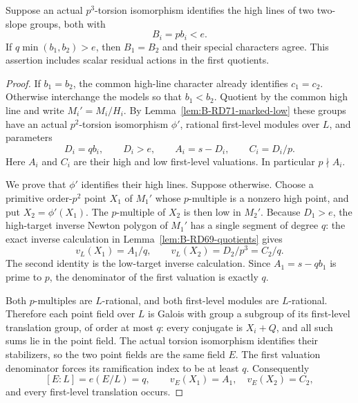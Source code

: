 \begin{proposition}
\label{prop:B-RD71-separated-high}
Suppose an actual \(p^3\)-torsion isomorphism identifies the
high lines of two two-slope groups, both with
\[
 B_i=pb_i<e.
 \tag{B-RD71.4}
\]
If \(q\min(b_1,b_2)>e\), then \(B_1=B_2\) and their special
characters agree. This assertion includes scalar residual
actions in the first quotients.
\end{proposition}
\begin{proof}
If \(b_1=b_2\), the common high-line character already
identifies \(c_1=c_2\). Otherwise interchange the models
so that \(b_1<b_2\).
Quotient by the common high line and write \(M_i'=M_i/H_i\).
By Lemma~\ref{lem:B-RD71-marked-low} these groups have an
actual \(p^2\)-torsion isomorphism \(\phi'\), rational
first-level modules over \(L\), and parameters
\[
 D_i=q b_i,\qquad D_i>e,\qquad
 A_i=s-D_i,\qquad C_i=D_i/p .
 \tag{B-RD71.5}
\]
Here \(A_i\) and \(C_i\) are their high and low first-level
valuations. In particular \(p\nmid A_i\).

We prove that \(\phi'\) identifies their high lines.
Suppose otherwise. Choose a primitive order-\(p^2\) point
\(X_1\) of \(M_1'\) whose \(p\)-multiple is a nonzero high
point, and put \(X_2=\phi'(X_1)\).
The \(p\)-multiple of \(X_2\) is then low in \(M_2'\).
Because \(D_1>e\), the high-target inverse Newton polygon
of \(M_1'\) has a single segment of degree \(q\):
the exact inverse calculation in Lemma~\ref{lem:B-RD69-quotients}
gives
\[
 v_L(X_1)=A_1/q,\qquad
 v_L(X_2)=D_2/p^3=C_2/q .
 \tag{B-RD71.6}
\]
The second identity is the low-target inverse calculation.
Since \(A_1=s-qb_1\) is prime to \(p\), the denominator of
the first valuation is exactly \(q\).

Both \(p\)-multiples are \(L\)-rational, and both first-level
modules are \(L\)-rational. Therefore each point field over
\(L\) is Galois with group a subgroup of its first-level
translation group, of order at most \(q\): every conjugate
is \(X_i+Q\), and all such sums lie in the point field.
The actual torsion isomorphism identifies their stabilizers,
so the two point fields are the same field \(E\).
The first valuation denominator forces its ramification
index to be at least \(q\). Consequently
\[
 [E:L]=e(E/L)=q,\qquad
 v_E(X_1)=A_1,\quad v_E(X_2)=C_2,
 \tag{B-RD71.7}
\]
and every first-level translation occurs.


\end{proof}
